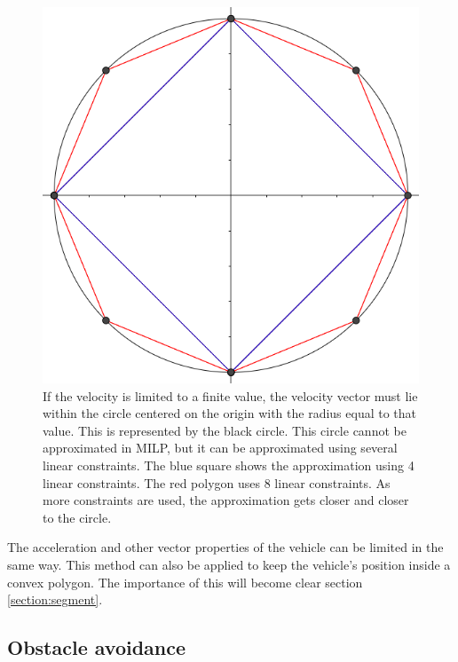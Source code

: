 \begin{figure}
    \centering
        \includegraphics[width=0.7\columnwidth]{img/circlelinear}
    \caption{If the velocity is limited to a finite value, the velocity vector must lie within the circle centered on the origin with the radius equal to that value. This is represented by the black circle. This circle cannot be approximated in MILP, but it can be approximated using several linear constraints. The blue square shows the approximation using 4 linear constraints. The red polygon uses 8 linear constraints. As more constraints are used, the approximation gets closer and closer to the circle. }\label{fig:circlelinear}
\end{figure}
The acceleration and other vector properties of the vehicle can be limited in the same way. This method can also be applied to keep the vehicle's position inside a convex polygon. The importance of this will become clear section \ref{section:segment}.
\subsection{Obstacle avoidance}

